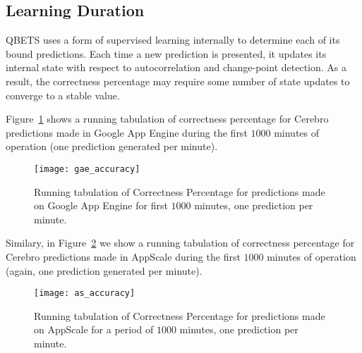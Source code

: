 \subsection{Learning Duration}

QBETS uses a form of supervised learning internally to determine each of its
bound predictions.  Each time a new prediction is presented, it updates its
internal state with respect to autocorrelation and change-point detection.  As
a result, the correctness percentage may require some number of state updates
to converge to a stable value.


Figure~\ref{fig:gae_accuracy} shows a running tabulation of
correctness percentage for Cerebro
predictions made in Google App Engine during the first 
$1000$ minutes of operation (one prediction generated per minute). 
\begin{figure}
\centering
\texttt{[image: gae\_accuracy]}
\caption{Running tabulation of Correctness Percentage for predictions made on Google App 
Engine for first $1000$ minutes, one prediction per minute.}
\label{fig:gae_accuracy}
\end{figure}
Similary, in Figure~\ref{fig:as_accuracy} we show a running tabulation of
correctness percentage for Cerebro
predictions made in AppScale during the first 
$1000$ minutes of operation (again, one prediction generated per minute). 
\begin{figure}
\centering
\texttt{[image: as\_accuracy]}
\caption{Running tabulation of Correctness Percentage for predictions made on AppScale for a period
of $1000$ minutes, one prediction per minute.}
\label{fig:as_accuracy}
\end{figure}

